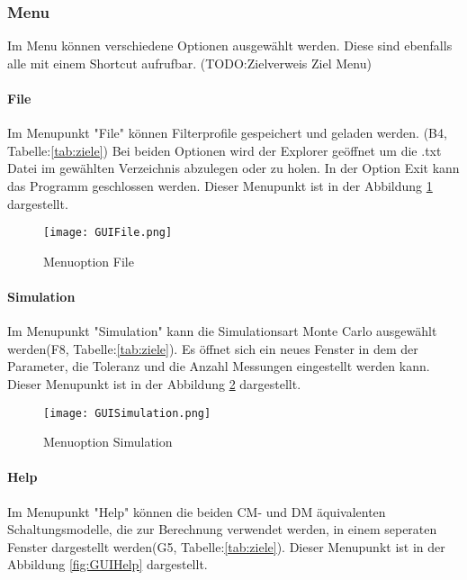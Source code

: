 \subsubsection{Menu} \label{subsubsec:menu}

Im Menu können verschiedene Optionen ausgewählt werden. Diese sind ebenfalls alle mit einem Shortcut aufrufbar. (TODO:Zielverweis Ziel Menu)

\bigskip
{}
\paragraph{File} \label{para:file}
Im Menupunkt "File" können Filterprofile gespeichert und geladen werden. (B4, Tabelle:\ref{tab:ziele}) Bei beiden Optionen wird der Explorer geöffnet um die .txt Datei im gewählten Verzeichnis abzulegen oder zu holen. In der Option Exit kann das Programm geschlossen werden. Dieser Menupunkt ist in der Abbildung \ref{fig:GUIFile}  dargestellt.

\begin{figure}[H]
	\centering
	\texttt{[image: GUIFile.png]}
	\caption{Menuoption File}
	\label{fig:GUIFile}
\end{figure}

\bigskip

\paragraph{Simulation} \label{para:simulation}
Im Menupunkt "Simulation" kann die Simulationsart Monte Carlo ausgewählt werden(F8, Tabelle:\ref{tab:ziele}). Es öffnet sich ein neues Fenster in dem der Parameter, die Toleranz und die Anzahl Messungen eingestellt werden kann. Dieser Menupunkt ist in der Abbildung \ref{fig:GUISimulation} dargestellt.

\begin{figure}[H]
	\centering
	\texttt{[image: GUISimulation.png]}
	\caption{Menuoption Simulation}
	\label{fig:GUISimulation}
\end{figure}

\newpage

\paragraph{Help} \label{para:Help}
Im Menupunkt "Help" können die beiden CM- und DM äquivalenten Schaltungsmodelle, die zur Berechnung verwendet werden, in einem seperaten Fenster dargestellt werden(G5, Tabelle:\ref{tab:ziele}). Dieser Menupunkt ist in der Abbildung \ref{fig:GUIHelp}  dargestellt.

